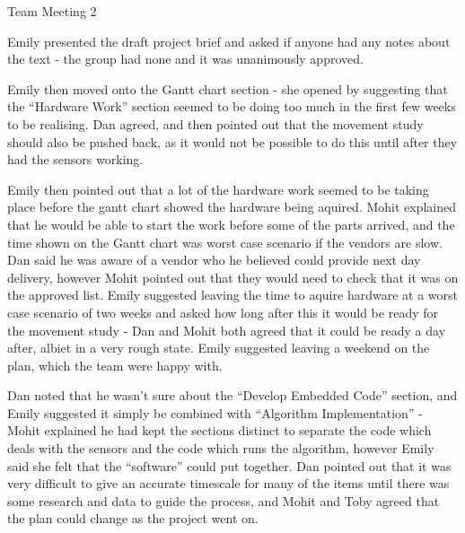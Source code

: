 \documentclass{article}
\begin{document}

\begin{Minutes}{Team Meeting 2}
\maketitle


Emily presented the draft project brief and asked if anyone had any notes about the text -
the group had none and it was unanimously approved.

Emily then moved onto the Gantt chart section - she opened by suggesting that the ``Hardware Work''
section seemed to be doing too much in the first few weeks to be realising. Dan agreed, and then pointed
out that the movement study should also be pushed back, as it would not be possible to do this until
after they had the sensors working.

Emily then pointed out that a lot of the hardware work seemed to be
taking place before the gantt chart showed the hardware being aquired. Mohit explained that he would be
able to start the work before some of the parts arrived, and the time shown on the Gantt chart was
worst case scenario if the vendors are slow. Dan said he was aware of a vendor who he believed could
provide next day delivery, however Mohit pointed out that they would need to check that it was on the
approved list. Emily suggested leaving the time to aquire hardware at a worst case scenario of two weeks
and asked how long after this it would be ready for the movement study - Dan and Mohit both agreed that
it could be ready a day after, albiet in a very rough state. Emily suggested leaving a weekend on the
plan, which the team were happy with.

Dan noted that he wasn't sure about the ``Develop Embedded Code'' section, and Emily suggested it simply
be combined with ``Algorithm Implementation'' - Mohit explained he had kept the sections distinct to
separate the code which deals with the sensors and the code which runs the algorithm, however Emily said
she felt that the ``software'' could put together. Dan pointed out that it was very difficult to give
an accurate timescale for many of the items until there was some research and data to guide the process, and
Mohit and Toby agreed that the plan could change as the project went on.


\end{Minutes}
\end{document}
